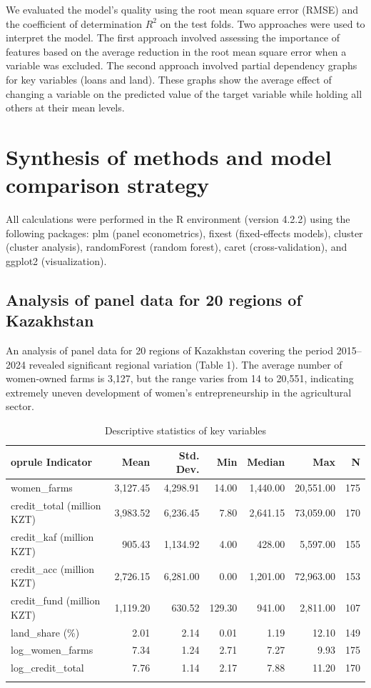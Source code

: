 \documentclass[pdflatex,sn-mathphys-ay]{sn-jnl}
\begin{document}
We evaluated the model's quality using the root mean square error (RMSE)
and the coefficient of determination $R^2$ on the test folds. Two
approaches were used to interpret the model. The first approach involved
assessing the importance of features based on the average reduction in
the root mean square error when a variable was excluded. The second
approach involved partial dependency graphs for key variables (loans and
land). These graphs show the average effect of changing a variable on
the predicted value of the target variable while holding all others at
their mean levels.

\section{Synthesis of methods and model comparison strategy}

All calculations were performed in the R environment (version 4.2.2)
using the following packages: plm (panel econometrics), fixest
(fixed-effects models), cluster (cluster analysis), randomForest (random
forest), caret (cross-validation), and ggplot2 (visualization).

\subsection{Analysis of panel data for 20 regions of Kazakhstan}

An analysis of panel data for 20 regions of Kazakhstan covering the
period 2015--2024 revealed significant regional variation (Table 1). The
average number of women-owned farms is 3,127, but the range varies from
14 to 20,551, indicating extremely uneven development of women's
entrepreneurship in the agricultural sector.

\begin{table}[htbp]
\caption{Descriptive statistics of key variables}\label{tab:descriptive}
\small
\begin{tabular*}{\textwidth}{@{\extracolsep{\fill}}p{}rrrrrr@{}}
	oprule
Indicator & Mean & Std. Dev. & Min & Median & Max & N\\
\midrule
women\_farms & 3,127.45 & 4,298.91 & 14.00 & 1,440.00 & 20,551.00 & 175\\
credit\_total (million KZT) & 3,983.52 & 6,236.45 & 7.80 & 2,641.15 & 73,059.00 & 170\\
credit\_kaf (million KZT) & 905.43 & 1,134.92 & 4.00 & 428.00 & 5,597.00 & 155\\
credit\_acc (million KZT) & 2,726.15 & 6,281.00 & 0.00 & 1,201.00 & 72,963.00 & 153\\
credit\_fund (million KZT) & 1,119.20 & 630.52 & 129.30 & 941.00 & 2,811.00 & 107\\
land\_share (\%) & 2.01 & 2.14 & 0.01 & 1.19 & 12.10 & 149\\
log\_women\_farms & 7.34 & 1.24 & 2.71 & 7.27 & 9.93 & 175\\
log\_credit\_total & 7.76 & 1.14 & 2.17 & 7.88 & 11.20 & 170\\
\botrule
\end{tabular*}
\end{table}
\end{document}
